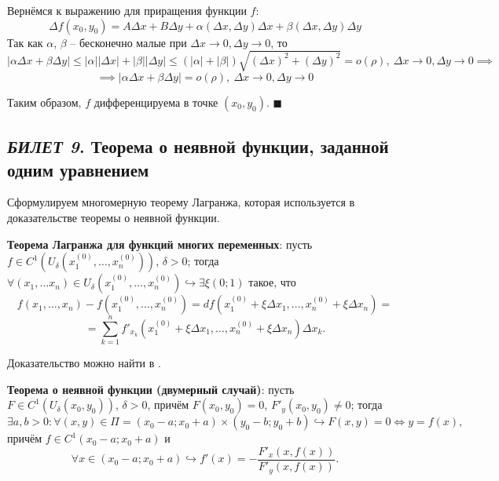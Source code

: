 \documentclass[12pt, a4paper, reqno]{article}
\begin{document}
    Вернёмся к выражению для приращения функции $f$:
    \begin{equation*}
        \Delta f(x_0, y_0) = A \Delta x + B \Delta y + \alpha(\Delta x, \Delta y)\Delta x +
            \beta(\Delta x, \Delta y)\Delta y
    \end{equation*}
    Так как $\alpha$, $\beta$ -- бесконечно малые при $\Delta x \to 0, \Delta y \to 0$, то
    \begin{equation*}
        |\alpha \Delta x + \beta \Delta y| \leq |\alpha||\Delta x| + |\beta||\Delta y| \leq
        (|\alpha| + |\beta|)\sqrt{(\Delta x)^2 + (\Delta y)^2} = o(\rho),\ \Delta x \to 0, \Delta y \to 0
        \implies
    \end{equation*}
    \begin{equation*}
        \implies |\alpha \Delta x + \beta \Delta y| = o(\rho),\ \Delta x \to 0, \Delta y \to 0
    \end{equation*}

    Таким образом, $f$ дифференцируема в точке $(x_0, y_0)$.
    $\blacksquare$

\newpage
\subsection{\textit{БИЛЕТ 9}. Теорема о неявной функции, заданной одним уравнением}

    Сформулируем многомерную теорему Лагранжа, которая используется в доказательстве теоремы о
    неявной функции.

    \textbf{Теорема Лагранжа для функций многих переменных}: пусть
    $f \in C^1(U_{\delta}(x_1^{(0)}, \ldots, x_n^{(0)}))$, $\delta > 0$; тогда
    $\forall (x_1, \ldots x_n) \in U_{\delta}(x_1^{(0)}, \ldots, x_n^{(0)}) \hookrightarrow
    \exists \xi (0; 1)$
    такое, что
    \begin{equation*}
        f(x_1, \ldots, x_n) - f(x_1^{(0)}, \ldots, x_n^{(0)}) =
        df(x_1^{(0)} + \xi\Delta x_1, \ldots, x_n^{(0)} + \xi\Delta x_n) =
    \end{equation*}
    \begin{equation*}
        = \sum\limits_{k = 1}^{n}
            f'_{x_k}(x_1^{(0)} + \xi\Delta x_1, \ldots, x_n^{(0)} + \xi\Delta x_n)\Delta x_k.
    \end{equation*}

    Доказательство можно найти в \cite{petrovich-2}.

    \textbf{Теорема о неявной функции (двумерный случай)}: пусть $F \in C^1(U_{\delta}(x_0, y_0))$,
    $\delta > 0$, причём $F(x_0, y_0) = 0$, $F'_y(x_0, y_0) \neq 0$; тогда
    \begin{equation*}
        \exists a, b > 0: \forall (x, y) \in \Pi = (x_0 - a; x_0 + a) \times (y_0 - b; y_0 + b) \hookrightarrow
        F(x, y) = 0 \iff y = f(x),
    \end{equation*}
    причём $f \in C^1(x_0 - a; x_0 + a)$ и
    \begin{equation*}
        \forall x \in (x_0 - a; x_0 + a) \hookrightarrow f'(x) = -\frac{F'_x(x, f(x))}{F'_y(x, f(x))}.
    \end{equation*}
\end{document}
